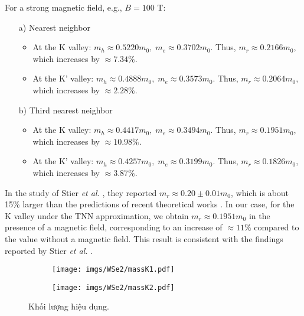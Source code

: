 \documentclass{article}
\begin{document}
For a strong magnetic field, e.g., $B = 100$ T:  
\begin{itemize}
	\item[a)] Nearest neighbor  
	\begin{itemize}
		\item At the K valley: $m_{h} \approx 0.5220 m_{0},\; m_{e} \approx 0.3702 m_{0}$. Thus, $m_{r} \approx 0.2166 m_{0}$, which increases by $\approx 7.34\%$.  
		\item At the K' valley: $m_{h} \approx 0.4888 m_{0},\; m_{e} \approx 0.3573 m_{0}$. Thus, $m_{r} \approx 0.2064 m_{0}$, which increases by $\approx 2.28\%$.  
	\end{itemize}
	\item[b)] Third nearest neighbor  
	\begin{itemize}
		\item At the K valley: $m_{h} \approx 0.4417 m_{0},\; m_{e} \approx 0.3494 m_{0}$. Thus, $m_{r} \approx 0.1951 m_{0}$, which increases by $\approx 10.98\%$.  
		\item At the K' valley: $m_{h} \approx 0.4257 m_{0},\; m_{e} \approx 0.3199 m_{0}$. Thus, $m_{r} \approx 0.1826 m_{0}$, which increases by $\approx 3.87\%$.  
	\end{itemize}
\end{itemize}

In the study of Stier \textit{et al.} \cite{stier2018}, they reported $m_{r} \approx 0.20 \pm 0.01 m_{0}$, which is about 15\% larger than the predictions of recent theoretical works \cite{berkelbach2013,kylanpaa2015}. In our case, for the K valley under the TNN approximation, we obtain $m_{r} \approx 0.1951 m_{0}$ in the presence of a magnetic field, corresponding to an increase of $\approx 11\%$ compared to the value without a magnetic field. This result is consistent with the findings reported by Stier \textit{et al.} \cite{stier2018}.  

\begin{figure}[htb]
	\begin{subfigure}{0.495\textwidth}
		\centering
		\texttt{[image: imgs/WSe2/massK1.pdf]}
	\end{subfigure}
	\begin{subfigure}{0.495\textwidth}
		\centering
		\texttt{[image: imgs/WSe2/massK2.pdf]}
	\end{subfigure}
	\caption{Khối lượng hiệu dụng.}
\end{figure}


\newpage
\end{document}

